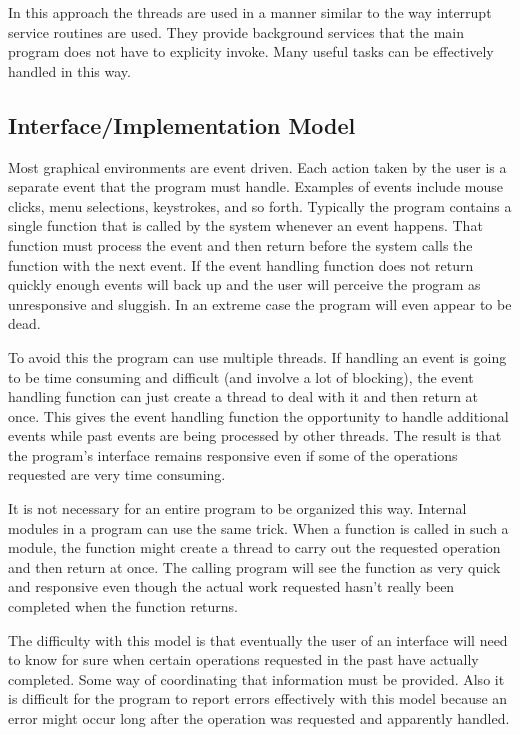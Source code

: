 In this approach the threads are used in a manner similar to the way interrupt service routines
are used. They provide background services that the main program does not have to explicity
invoke. Many useful tasks can be effectively handled in this way.

\subsection{Interface/Implementation Model}
\label{subsec:interface-model}

Most graphical environments are event driven. Each action taken by the user is a separate event
that the program must handle. Examples of events include mouse clicks, menu selections,
keystrokes, and so forth. Typically the program contains a single function that is called by the
system whenever an event happens. That function must process the event and then return before
the system calls the function with the next event. If the event handling function does not
return quickly enough events will back up and the user will perceive the program as unresponsive
and sluggish. In an extreme case the program will even appear to be dead.

To avoid this the program can use multiple threads. If handling an event is going to be time
consuming and difficult (and involve a lot of blocking), the event handling function can just
create a thread to deal with it and then return at once. This gives the event handling function
the opportunity to handle additional events while past events are being processed by other
threads. The result is that the program's interface remains responsive even if some of the
operations requested are very time consuming.

It is not necessary for an entire program to be organized this way. Internal modules in a
program can use the same trick. When a function is called in such a module, the function might
create a thread to carry out the requested operation and then return at once. The calling
program will see the function as very quick and responsive even though the actual work requested
hasn't really been completed when the function returns.

The difficulty with this model is that eventually the user of an interface will need to know for
sure when certain operations requested in the past have actually completed. Some way of
coordinating that information must be provided. Also it is difficult for the program to report
errors effectively with this model because an error might occur long after the operation was
requested and apparently handled.

